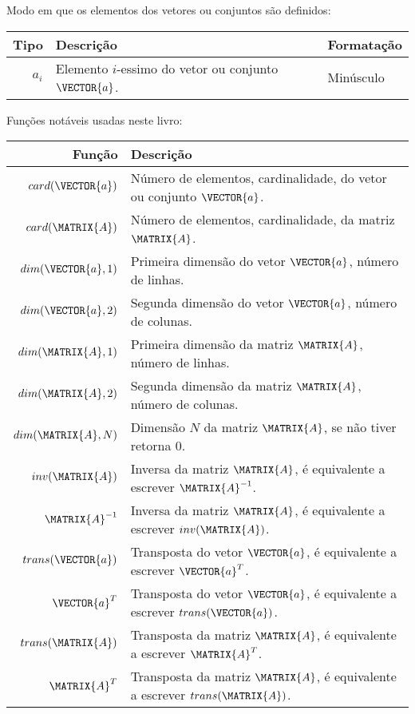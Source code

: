 \begin{notation}Modo em que os elementos dos vetores ou conjuntos são definidos:\\
\begin{tabular}{r | p{.6\linewidth} | l}
\hline	
Tipo & Descrição & Formatação \\ \hline
$a_{i}$ & Elemento $i$-essimo do vetor ou conjunto  $\VECTOR{a}$.& Minúsculo \\
\end{tabular}
\end{notation}


\begin{notation}Funções notáveis usadas neste livro:\\
\begin{tabular}{r | l }
\hline	
Função & Descrição \\ \hline
$card(\VECTOR{a})$ & Número de elementos, cardinalidade, do vetor ou conjunto $\VECTOR{a}$. \\
$card(\MATRIX{A})$ & Número de elementos, cardinalidade, da matriz $\MATRIX{A}$. \\
\hline
$dim(\VECTOR{a},1)$ & Primeira dimensão do vetor $\VECTOR{a}$, número de linhas. \\
$dim(\VECTOR{a},2)$ & Segunda dimensão do vetor $\VECTOR{a}$, número de colunas. \\
$dim(\MATRIX{A},1)$ & Primeira dimensão da matriz $\MATRIX{A}$, número de linhas. \\
$dim(\MATRIX{A},2)$ & Segunda dimensão da matriz $\MATRIX{A}$, número de colunas. \\
$dim(\MATRIX{A},N)$ & Dimensão $N$ da matriz $\MATRIX{A}$, se não tiver retorna $0$. \\
\hline
$inv(\MATRIX{A})$ & Inversa da matriz $\MATRIX{A}$, é equivalente a escrever $\MATRIX{A}^{-1}$. \\
$\MATRIX{A}^{-1}$ & Inversa da matriz $\MATRIX{A}$, é equivalente a escrever $inv(\MATRIX{A})$. \\
\hline
$trans(\VECTOR{a})$ & Transposta do vetor $\VECTOR{a}$, é equivalente a escrever $\VECTOR{a}^{T}$. \\
$\VECTOR{a}^{T}$ & Transposta do vetor $\VECTOR{a}$, é equivalente a escrever $trans(\VECTOR{a})$. \\
$trans(\MATRIX{A})$ & Transposta da matriz $\MATRIX{A}$, é equivalente a escrever $\MATRIX{A}^{T}$. \\
$\MATRIX{A}^{T}$ & Transposta da matriz $\MATRIX{A}$, é equivalente a escrever $trans(\MATRIX{A})$. \\
\end{tabular}
\end{notation}

